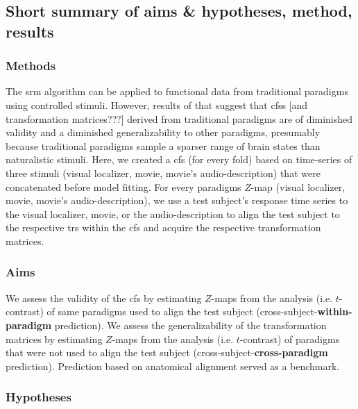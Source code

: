 \subsection{Short summary of aims \& hypotheses, method, results}



\subsubsection{Methods}

The \ac{srm} algorithm can be applied to functional data from traditional
paradigms using controlled stimuli.
%
However, results of \citet{haxby2011common} that suggest that \acp{cfs} [and
transformation matrices???] derived from traditional paradigms are of diminished
validity and a diminished generalizability to other paradigms, presumably
because traditional paradigms sample a sparser range of brain states than
naturalistic stimuli.
%
Here, we created a \ac{cfs} (for every fold) based on time-series of three
stimuli (visual localizer, movie, movie's audio-description) that were
concatenated before model fitting.
%
For every paradigms $Z$-map (visual localizer, movie, movie's
audio-description), we use a test subject's response time series to the visual
localizer, movie, or the audio-description to align the test subject to the
respective \acp{tr} within the \ac{cfs} and acquire the respective
transformation matrices.


\subsubsection{Aims}



%
We assess the validity of the \ac{cfs} by estimating $Z$-maps from the analysis
(i.e. $t$-contrast) of same paradigms used to align the test subject
(cross-subject-\textbf{within-paradigm} prediction).
%
We assess the generalizability of the transformation matrices by estimating
$Z$-maps from the analysis (i.e. $t$-contrast) of paradigms that were not used
to align the test subject (cross-subject-\textbf{cross-paradigm} prediction).
%
Prediction based on anatomical alignment served as a benchmark.


\subsubsection{Hypotheses}

